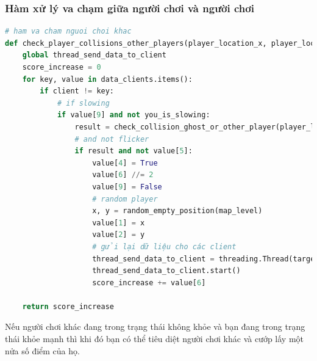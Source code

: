 \documentclass[a4paper]{article}
\begin{document}
\subsubsection{Hàm xử lý va chạm giữa người chơi và người chơi}
\begin{lstlisting}[language=Python]
# ham va cham nguoi choi khac
def check_player_collisions_other_players(player_location_x, player_location_y, client, you_is_slowing):
    global thread_send_data_to_client
    score_increase = 0
    for key, value in data_clients.items():
        if client != key:
            # if slowing
            if value[9] and not you_is_slowing:
                result = check_collision_ghost_or_other_player(player_location_x, player_location_y, value[1], value[2])
                # and not flicker
                if result and not value[5]:
                    value[4] = True
                    value[6] //= 2
                    value[9] = False
                    # random player
                    x, y = random_empty_position(map_level)
                    value[1] = x
                    value[2] = y
                    # gửi lại dữ liệu cho các client
                    thread_send_data_to_client = threading.Thread(target=send_you_data, args=({"you": value},eval(key),))
                    thread_send_data_to_client.start()
                    score_increase += value[6]

    return score_increase

\end{lstlisting}
Nếu người chơi khác đang trong trạng thái không khỏe và bạn đang trong trạng thái khỏe mạnh thì khi đó bạn có thể tiêu diệt người chơi khác và cướp lấy một nửa số điểm của họ. 
\end{document}

